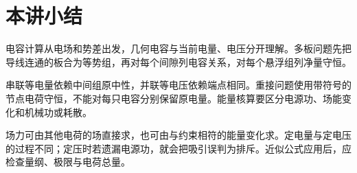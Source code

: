 \section{本讲小结}

电容计算从电场和势差出发，几何电容与当前电量、电压分开理解。多板问题先把导线连通的板合为等势组，再对每个间隙列电容关系，对每个悬浮组列净量守恒。

串联等电量依赖中间组原中性，并联等电压依赖端点相同。重接问题使用带符号的节点电荷守恒，不能对每只电容分别保留原电量。能量核算要区分电源功、场能变化和机械功或耗散。

场力可由其他电荷的场直接求，也可由与约束相符的能量变化求。定电量与定电压的过程不同；定压时若遗漏电源功，就会把吸引误判为排斥。近似公式应用后，应检查量纲、极限与电荷总量。

